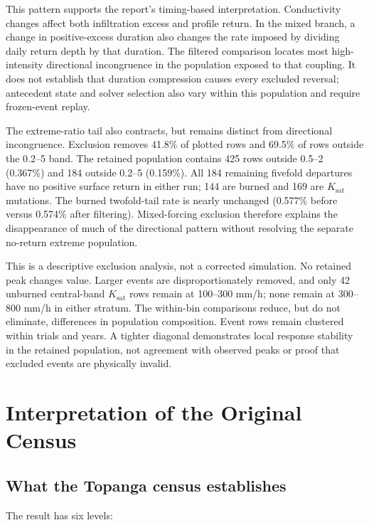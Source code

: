 \documentclass[11pt]{article}
\newcommand{\Ksat}{\ensuremath{K_{\mathrm{sat}}}}
\begin{document}
This pattern supports the report's timing-based interpretation. Conductivity
changes affect both infiltration excess and profile return. In the mixed
branch, a change in positive-excess duration also changes the rate imposed
by dividing daily return depth by that duration. The filtered comparison
locates most high-intensity directional incongruence in the population exposed
to that coupling. It does not establish that duration compression causes
every excluded reversal; antecedent state and solver selection also vary
within this population and require frozen-event replay.

The extreme-ratio tail also contracts, but remains distinct from directional
incongruence. Exclusion removes 41.8\% of plotted rows and 69.5\% of rows
outside the 0.2--5 band. The retained population contains 425 rows outside
0.5--2 (0.367\%) and 184 outside 0.2--5 (0.159\%). All 184 remaining
fivefold departures have no positive surface return in either run; 144 are
burned and 169 are \Ksat{} mutations. The burned twofold-tail rate is nearly
unchanged (0.577\% before versus 0.574\% after filtering). Mixed-forcing
exclusion therefore explains the disappearance of much of the directional
pattern without resolving the separate no-return extreme population.

This is a descriptive exclusion analysis, not a corrected simulation. No
retained peak changes value. Larger events are disproportionately removed,
and only 42 unburned central-band \Ksat{} rows remain at 100--300 mm/h;
none remain at 300--800 mm/h in either stratum. The within-bin comparisons
reduce, but do not eliminate, differences in population composition. Event
rows remain clustered within trials and years. A tighter diagonal demonstrates
local response stability in the retained population, not agreement with
observed peaks or proof that excluded events are physically invalid.

\section{Interpretation of the Original Census}

\subsection{What the Topanga census establishes}

The result has six levels:
\end{document}
